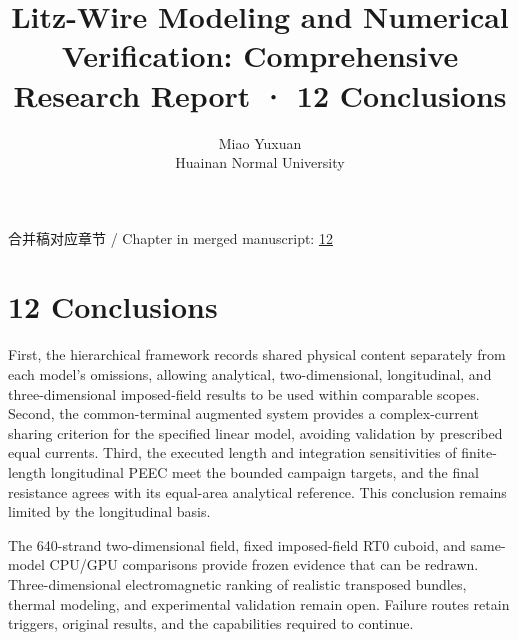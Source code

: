 \documentclass[11pt]{article}
\begin{document}
\title{Litz-Wire Modeling and Numerical Verification: Comprehensive Research Report · 12 Conclusions}
\author{Miao Yuxuan\\Huainan Normal University}
\date{}
\maketitle
\noindent 合并稿对应章节 / Chapter in merged manuscript: \href{report_en_single.pdf#chapter-12}{12}\par
\FloatBarrier
\section*{12 Conclusions}
\hypertarget{chapter-12}{}
First, the hierarchical framework records shared physical content separately from each model’s omissions, allowing analytical, two-dimensional, longitudinal, and three-dimensional imposed-field results to be used within comparable scopes. Second, the common-terminal augmented system provides a complex-current sharing criterion for the specified linear model, avoiding validation by prescribed equal currents. Third, the executed length and integration sensitivities of finite-length longitudinal PEEC meet the bounded campaign targets, and the final resistance agrees with its equal-area analytical reference. This conclusion remains limited by the longitudinal basis.


The 640-strand two-dimensional field, fixed imposed-field RT0 cuboid, and same-model CPU/GPU comparisons provide frozen evidence that can be redrawn. Three-dimensional electromagnetic ranking of realistic transposed bundles, thermal modeling, and experimental validation remain open. Failure routes retain triggers, original results, and the capabilities required to continue.
\end{document}
